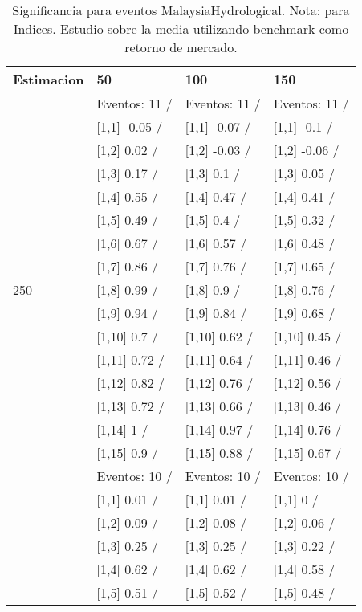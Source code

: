 \begin{table}

\caption{Significancia para eventos MalaysiaHydrological. Nota: para Indices. Estudio sobre la media utilizando benchmark como retorno de mercado.}
\centering
\begin{tabular}[t]{llll}
\toprule
Estimacion & 50 & 100 & 150\\
\midrule
 & Eventos:  11 / & Eventos:  11 / & Eventos:  11 /\\
 & {}[1,1] -0.05  / & {}[1,1] -0.07  / & {}[1,1] -0.1  /\\
 & {}[1,2] 0.02  / & {}[1,2] -0.03  / & {}[1,2] -0.06  /\\
 & {}[1,3] 0.17  / & {}[1,3] 0.1  / & {}[1,3] 0.05  /\\
 & {}[1,4] 0.55  / & {}[1,4] 0.47  / & {}[1,4] 0.41  /\\
\addlinespace
 & {}[1,5] 0.49  / & {}[1,5] 0.4  / & {}[1,5] 0.32  /\\
 & {}[1,6] 0.67  / & {}[1,6] 0.57  / & {}[1,6] 0.48  /\\
 & {}[1,7] 0.86  / & {}[1,7] 0.76  / & {}[1,7] 0.65  /\\
250 & {}[1,8] 0.99  / & {}[1,8] 0.9  / & {}[1,8] 0.76  /\\
 & {}[1,9] 0.94  / & {}[1,9] 0.84  / & {}[1,9] 0.68  /\\
\addlinespace
 & {}[1,10] 0.7  / & {}[1,10] 0.62  / & {}[1,10] 0.45  /\\
 & {}[1,11] 0.72  / & {}[1,11] 0.64  / & {}[1,11] 0.46  /\\
 & {}[1,12] 0.82  / & {}[1,12] 0.76  / & {}[1,12] 0.56  /\\
 & {}[1,13] 0.72  / & {}[1,13] 0.66  / & {}[1,13] 0.46  /\\
 & {}[1,14] 1  / & {}[1,14] 0.97  / & {}[1,14] 0.76  /\\
\addlinespace
 & {}[1,15] 0.9  / & {}[1,15] 0.88  / & {}[1,15] 0.67  /\\
 & Eventos:  10 / & Eventos:  10 / & Eventos:  10 /\\
 & {}[1,1] 0.01  / & {}[1,1] 0.01  / & {}[1,1] 0  /\\
 & {}[1,2] 0.09  / & {}[1,2] 0.08  / & {}[1,2] 0.06  /\\
 & {}[1,3] 0.25  / & {}[1,3] 0.25  / & {}[1,3] 0.22  /\\
\addlinespace
 & {}[1,4] 0.62  / & {}[1,4] 0.62  / & {}[1,4] 0.58  /\\
 & {}[1,5] 0.51  / & {}[1,5] 0.52  / & {}[1,5] 0.48  /\\

\end{tabular}
\end{table}

